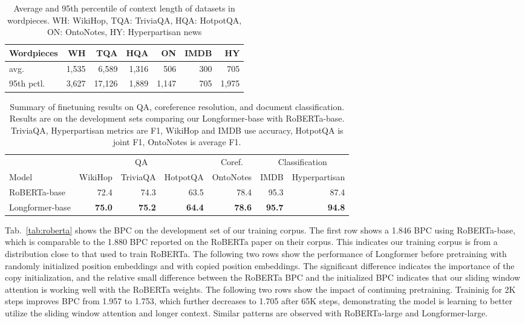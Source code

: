 \documentclass[11pt,a4paper]{article}
\newcommand{\model}{Longformer\xspace}
\begin{document}
\begin{table}[t]
    \centering
    \small
    \setlength{\tabcolsep}{3pt} 
    \begin{tabular}{@{}lrrrrrr@{}}
    \toprule
    Wordpieces & WH & TQA & HQA & ON & IMDB & HY \\ \midrule
    avg.    & 1,535 & 6,589 & 1,316 & 506 & 300 & 705   \\
    95th pctl.     & 3,627 & 17,126 & 1,889 & 1,147 & 705 & 1,975 \\ \bottomrule
    \end{tabular}
    \caption{Average and 95th percentile of context length of datasets in wordpieces. WH: WikiHop, TQA: TriviaQA, HQA: HotpotQA, ON: OntoNotes, HY: Hyperpartisan news} 
    \label{tab:doc-len}
\end{table}

\begin{table}[t]
    \centering
    \small
    \begin{tabular}{@{}lrrrrrr@{}}
    \toprule
     & \multicolumn{3}{c}{QA} & \multicolumn{1}{c}{Coref.} & \multicolumn{2}{c}{Classification} \\
     \cmidrule(lr){2-4} \cmidrule(lr){5-5} \cmidrule(l){6-7}
    Model &  WikiHop & TriviaQA & HotpotQA & OntoNotes & IMDB & Hyperpartisan \\
    \midrule
    RoBERTa-base    & 72.4 & 74.3 & 63.5  & 78.4 & 95.3 & 87.4 \\
    \model-base     & \textbf{75.0} & \textbf{75.2} & \textbf{64.4} & \textbf{78.6} & \textbf{95.7} & \textbf{94.8} \\
    \bottomrule
    \end{tabular}
    \caption{Summary of finetuning results on QA,  
    coreference resolution, and document classification. 
    Results are on the development sets comparing our
    \model-base with RoBERTa-base.
    TriviaQA, Hyperpartisan metrics are F1, WikiHop and IMDB use accuracy, HotpotQA is joint F1, OntoNotes is average F1.
    }
    \label{tab:finetune}
\end{table}

Tab.~\ref{tab:roberta} shows the BPC on the development 
set of our training corpus. The first row shows a 1.846 BPC using 
RoBERTa-base, which is comparable to the 1.880 BPC reported
on the RoBERTa paper on their corpus. This indicates 
our training corpus is from a distribution close to that used to train RoBERTa.
The following two rows show the performance of \model
before pretraining 
with randomly initialized position embeddings and with 
copied position embeddings. The significant difference indicates the importance of the copy initialization, and the relative small difference between the RoBERTa BPC and the initialized BPC indicates that our sliding window attention is working well with the RoBERTa weights.
The following two rows show the impact of continuing pretraining. 
Traininig for 2K steps improves BPC from 1.957 to 1.753, which further decreases to 1.705 after 65K steps, demonstrating the model is learning to better utilize the sliding window attention and longer context.
Similar patterns are observed with RoBERTa-large and \model-large.
\end{document}
